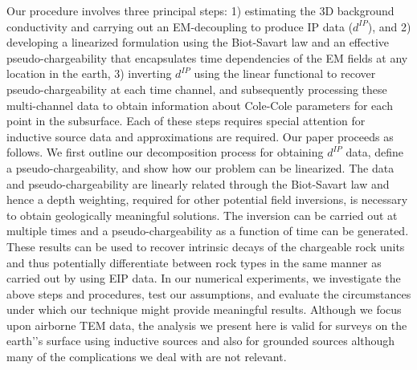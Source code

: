 \documentclass[extra,mreferee]{gji}
\newcommand{\dip}{d^{IP}}
\begin{document}
Our procedure involves three principal steps: 1) estimating the 3D background conductivity and carrying out an EM-decoupling to produce IP data ($\dip$), and 2) developing a linearized formulation using the Biot-Savart law and an effective pseudo-chargeability that encapsulates time dependencies of the EM fields at any location in the earth, 3) inverting $\dip$ using the linear functional to recover pseudo-chargeability at each time channel, and subsequently processing these multi-channel data to obtain information about Cole-Cole parameters for each point in the subsurface. Each of these steps requires special attention for inductive source data and approximations are required.
Our paper proceeds as follows. We first outline our decomposition process for obtaining $\dip$ data, define a pseudo-chargeability, and show how our problem can be linearized.
The data and  pseudo-chargeability are linearly related through the Biot-Savart law and hence a depth weighting, required for other potential field inversions, is necessary to obtain geologically meaningful solutions. The inversion can be carried out at multiple times and a pseudo-chargeability as a function of time can be generated. These results can be used to recover intrinsic decays of the chargeable rock units and thus potentially differentiate between rock types in the same manner as carried out by \cite{Yuval1997} using EIP data. In our numerical experiments, we investigate the above steps and procedures, test our assumptions, and evaluate the circumstances under which our technique might provide meaningful results. Although  we focus upon airborne TEM data, the analysis we present here is valid for surveys on the earth’'s surface using inductive sources and also for grounded sources although many of the complications we deal with are not relevant.

\end{document}
